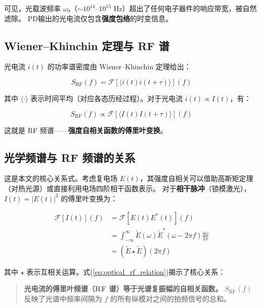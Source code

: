 \documentclass[11pt,a4paper]{article}
\newcommand{\FT}{\mathcal{F}}
\begin{document}
可见，光载波频率 $\omega_0$（$\sim 10^{14}$--$10^{15}$ Hz）超出了任何电子器件的响应带宽，被自然滤除。
PD输出的光电流仅包含\textbf{强度包络}的时变信息。

\subsection{Wiener--Khinchin 定理与 RF 谱}

光电流 $i(t)$ 的功率谱密度由 Wiener--Khinchin 定理给出\cite{Mandl1995}：

\begin{equation}\label{eq:wk_intensity}
S_{\text{RF}}(f) = \FT \left[ \langle i(t) i(t+\tau) \rangle \right](f)
\end{equation}

其中 $\langle \cdot \rangle$ 表示时间平均（对应各态历经过程）。对于光电流 $i(t) \propto I(t)$，有：

\begin{equation}\label{eq:rf_autocorr}
S_{\text{RF}}(f) \propto \FT \left[ \langle I(t) I(t+\tau) \rangle \right](f)
\end{equation}

这就是 RF 频谱——\textbf{强度自相关函数的傅里叶变换}。

\subsection{光学频谱与 RF 频谱的关系}

这是本文的核心关系式。考虑复电场 $E(t)$，其强度自相关可以借助高斯矩定理（对热光源）或直接利用电场四阶相干函数表示\cite{Loudon2000}。
对于\textbf{相干脉冲}（锁模激光），$I(t) = |E(t)|^2$ 的傅里叶变换为：

\begin{equation}\label{eq:optical_rf_relation}
\begin{aligned}
\FT[I(t)](f) &= \FT[E(t) E^*(t)](f) \\
&= \int_{-\infty}^{\infty} \tilde{E}(\omega) \tilde{E}^*(\omega - 2\pi f) \frac{\dd{\omega}}{2\pi} \\
&= (\tilde{E} \star \tilde{E})(2\pi f)
\end{aligned}
\end{equation}

其中 $\star$ 表示互相关运算。式(\ref{eq:optical_rf_relation})揭示了核心关系：

\begin{quote}
\textbf{光电流的傅里叶频谱（RF 谱）等于光谱复振幅的自相关函数。}
$S_{\text{RF}}(f)$ 反映了光谱中频率间隔为 $f$ 的所有纵模对之间的拍频信号的总和。
\end{quote}
\end{document}
